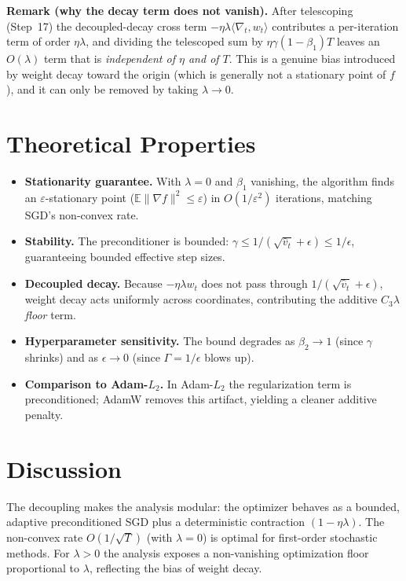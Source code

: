 \documentclass[11pt]{article}
\begin{document}
\noindent\textbf{Remark (why the decay term does not vanish).}
After telescoping (Step~17) the decoupled-decay cross term $-\eta\lambda\langle
\nabla_t,w_t\rangle$ contributes a per-iteration term of order $\eta\lambda$, and
dividing the telescoped sum by $\eta\gamma(1-\beta_1)T$ leaves an $O(\lambda)$ term
that is \emph{independent of $\eta$ and of $T$}. This is a genuine bias introduced by
weight decay toward the origin (which is generally not a stationary point of $f$), and
it can only be removed by taking $\lambda\to0$.

\section*{Theoretical Properties}
\begin{itemize}
\item \textbf{Stationarity guarantee.} With $\lambda=0$ and $\beta_1$ vanishing, the
algorithm finds an $\varepsilon$-stationary point ($\mathbb{E}\|\nabla f\|^2 \le
\varepsilon$) in $O(1/\varepsilon^2)$ iterations, matching SGD's non-convex rate.
\item \textbf{Stability.} The preconditioner is bounded:
$\gamma \le 1/(\sqrt{\hat v_t}+\epsilon) \le 1/\epsilon$,
guaranteeing bounded effective step sizes.
\item \textbf{Decoupled decay.} Because $-\eta\lambda w_t$ does not pass through
$1/(\sqrt{\hat v_t}+\epsilon)$, weight decay acts uniformly across coordinates,
contributing the additive $C_3\lambda$ \emph{floor} term.
\item \textbf{Hyperparameter sensitivity.} The bound degrades as $\beta_2\to 1$
(since $\gamma$ shrinks) and as $\epsilon\to 0$ (since $\Gamma=1/\epsilon$ blows up).
\item \textbf{Comparison to Adam-$L_2$.} In Adam-$L_2$ the regularization term is
preconditioned; AdamW removes this artifact, yielding a cleaner additive penalty.
\end{itemize}

\section*{Discussion}
The decoupling makes the analysis modular: the optimizer behaves as a bounded,
adaptive preconditioned SGD plus a deterministic contraction $(1-\eta\lambda)$.
The non-convex rate $O(1/\sqrt T)$ (with $\lambda=0$) is optimal for first-order
stochastic methods. For $\lambda>0$ the analysis exposes a non-vanishing optimization
floor proportional to $\lambda$, reflecting the bias of weight decay.
\end{document}
